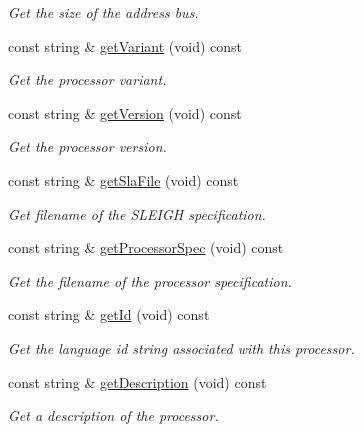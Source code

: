 \begin{DoxyCompactItemize}
\begin{DoxyCompactList}\small\item\em Get the size of the address bus. \end{DoxyCompactList}\item 
const string \& \mbox{\hyperlink{class_language_description_aeeb814dd5212cea3f7636de4ac22acea}{get\+Variant}} (void) const
\begin{DoxyCompactList}\small\item\em Get the processor variant. \end{DoxyCompactList}\item 
const string \& \mbox{\hyperlink{class_language_description_aa3a1f6a0d66bd5f9a6d8659a1c3cb87d}{get\+Version}} (void) const
\begin{DoxyCompactList}\small\item\em Get the processor version. \end{DoxyCompactList}\item 
const string \& \mbox{\hyperlink{class_language_description_a5db9068afb97964df97afab3c10af9ad}{get\+Sla\+File}} (void) const
\begin{DoxyCompactList}\small\item\em Get filename of the S\+L\+E\+I\+GH specification. \end{DoxyCompactList}\item 
const string \& \mbox{\hyperlink{class_language_description_aef9acf96d6dda8c01984cbfc6ab4f413}{get\+Processor\+Spec}} (void) const
\begin{DoxyCompactList}\small\item\em Get the filename of the processor specification. \end{DoxyCompactList}\item 
const string \& \mbox{\hyperlink{class_language_description_a5e965680dedba272edd47113834f9f48}{get\+Id}} (void) const
\begin{DoxyCompactList}\small\item\em Get the {\itshape language} {\itshape id} string associated with this processor. \end{DoxyCompactList}\item 
const string \& \mbox{\hyperlink{class_language_description_a45e5d45bbe225b5cafed3bfadd5de1e9}{get\+Description}} (void) const
\begin{DoxyCompactList}\small\item\em Get a description of the processor. \end{DoxyCompactList}\item 

\end{DoxyCompactItemize}

